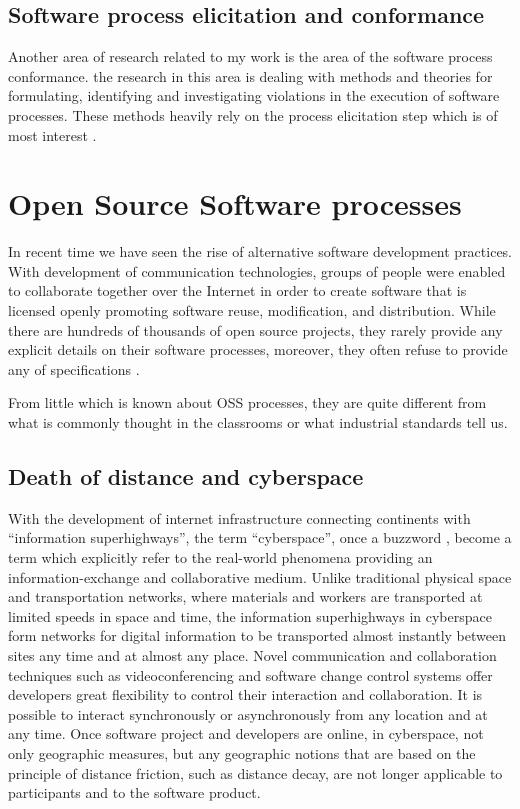 \subsection{Software process elicitation and conformance}
Another area of research related to my work is the area of the software process conformance. 
the research in this area is dealing with methods and theories for formulating, identifying and
investigating violations in the execution of software processes. These methods heavily rely
on the process elicitation step which is of most interest .

\section{Open Source Software processes}\label{oss.processes}
In recent time we have seen the rise of alternative software development practices. 
With development of communication technologies, groups of people were 
enabled to collaborate together over the Internet in order to create software that is 
licensed openly promoting software reuse, modification, and distribution. While there are 
hundreds of thousands of open source projects, they rarely provide any explicit details on 
their software processes, moreover, they often refuse to provide any of 
specifications \cite{Torvalds:2005}. 

From little which is known about OSS processes, they are quite different from what is 
commonly thought in the classrooms or what industrial standards tell us.

\subsection{Death of distance and cyberspace}
With the development of internet infrastructure connecting continents with ``information
superhighways'', the term ``cyberspace'', once a buzzword \cite{citeulike:11095763}, become 
a term which explicitly refer to the real-world phenomena providing an information-exchange
and collaborative medium. Unlike traditional physical space and transportation networks, where 
materials and workers are transported at limited speeds in space and time, the information 
superhighways in cyberspace form networks for digital information to be transported almost instantly 
between sites any time and at almost any place. 
Novel communication and collaboration techniques such as videoconferencing and software change 
control systems offer developers great flexibility to control their interaction and collaboration. 
It is possible to interact synchronously or asynchronously from any location and at any time. 
Once software project and developers are online, in cyberspace, not only geographic measures, but 
any geographic notions that are based on the principle of distance friction, such as distance decay,
are not longer applicable to participants and to the software product.

